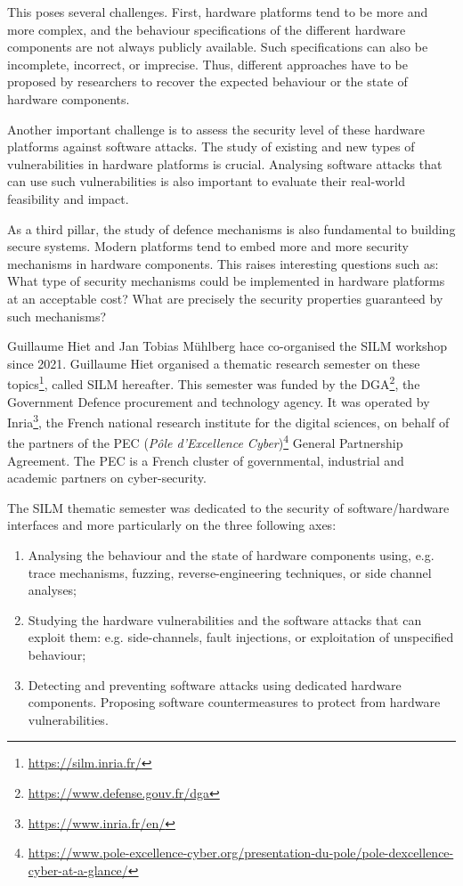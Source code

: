 \documentclass[a4paper,11pt]{article}
\begin{document}
This poses several challenges. First, hardware platforms tend to be more
and more complex, and the behaviour specifications of the different hardware
components are not always publicly available. Such specifications can also
be incomplete, incorrect, or imprecise. Thus, different approaches have to
be proposed by researchers to recover the expected behaviour or the state of
hardware components.

Another important challenge is to assess the security level of these
hardware platforms against software attacks. The study of existing and new
types of vulnerabilities in hardware platforms is crucial. Analysing
software attacks that can use such vulnerabilities is also important to
evaluate their real-world feasibility and impact.

As a third pillar, the study of defence mechanisms is also fundamental to
building secure systems. Modern platforms tend to embed more and more
security mechanisms in hardware components. This raises interesting
questions such as: What type of security mechanisms could be implemented in
hardware platforms at an acceptable cost? What are precisely the security
properties guaranteed by such mechanisms? 

Guillaume Hiet and Jan Tobias M\"uhlberg hace co-organised the SILM
workshop since 2021.
Guillaume Hiet organised a thematic
research semester on these topics\footnote{\url{https://silm.inria.fr/}},
called SILM hereafter. This semester was funded by the
DGA\footnote{\url{https://www.defense.gouv.fr/dga}}, the Government Defence
procurement and technology agency. It was  operated by
Inria\footnote{\url{https://www.inria.fr/en/}}, the French national
research institute for the digital sciences, on behalf of the partners of
the PEC (\textit{Pôle d'Excellence
Cyber})\footnote{\url{https://www.pole-excellence-cyber.org/presentation-du-pole/pole-dexcellence-cyber-at-a-glance/}}
General Partnership Agreement. The PEC is a French cluster of governmental,
industrial and academic partners on cyber-security.

The SILM thematic semester was dedicated to the security of
software/hardware interfaces and more particularly on the three
following axes:

\begin{enumerate}
%
    \item Analysing the behaviour and the state of hardware components
using, e.g. trace mechanisms, fuzzing, reverse-engineering techniques, or
side channel analyses;
%
    \item Studying the hardware vulnerabilities and the software attacks
that can exploit them: e.g. side-channels, fault injections, or
exploitation of unspecified behaviour;
%
    \item Detecting and preventing software attacks using dedicated
hardware components. Proposing software countermeasures to protect from
hardware vulnerabilities.
%
\end{enumerate}
\end{document}
